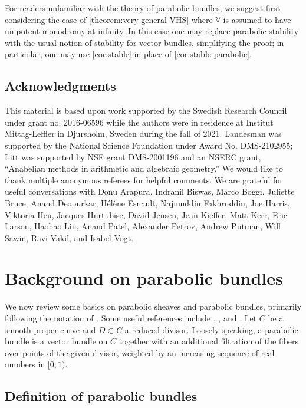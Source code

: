 \documentclass[12 pt]{amsart}
\theoremstyle{plain}
\theoremstyle{definition}
\theoremstyle{remark}
\numberwithin{equation}{section}
\begin{document}
For readers unfamiliar with the theory of parabolic bundles, we suggest first considering the case of \autoref{theorem:very-general-VHS} where $\mathbb{V}$ is assumed to have unipotent monodromy at infinity. In this case one may replace parabolic stability with the usual notion of stability for vector bundles,  simplifying the proof;  in particular, one may use \autoref{cor:stable} in place of \autoref{cor:stable-parabolic}.
\subsection{Acknowledgments}
This material is based upon work supported by the Swedish Research Council under
grant no. 2016-06596 while the authors were in residence at Institut
Mittag-Leffler in Djursholm, Sweden during the fall of 2021. 
Landesman was supported by the National Science
Foundation under Award No. DMS-2102955;
Litt was supported by NSF grant DMS-2001196 and an NSERC grant, “Anabelian methods in arithmetic and algebraic geometry.” 
We would like to thank multiple anonymous referees for helpful comments.
We are grateful for useful conversations with 
Donu Arapura,
Indranil Biswas, 
Marco Boggi, 
Juliette Bruce, 
Anand Deopurkar,
H\'el\`ene Esnault, 
Najmuddin Fakhruddin,
Joe Harris,
Viktoria Heu,
Jacques Hurtubise, 
David Jensen, 
Jean Kieffer,
Matt Kerr,
Eric Larson, 
Haohao Liu,
Anand Patel,
Alexander Petrov,
Andrew Putman,
Will Sawin,
Ravi Vakil,
and Isabel Vogt.


\section{Background on parabolic bundles}
\label{section:parabolic}

We now review some basics on parabolic sheaves and parabolic bundles, primarily following the notation of
\cite[\S2.3]{BHH:parabolic}.
Some useful references include 
\cite[Part 3, \S1]{seshadri:fibres-vectoriels-sur-les-courbes-algebriques},
\cite[\S1 and \S3]{yokogawa:infinitesimal-deformation}, and
\cite[\S2]{bodenY:moduli-spaces-of-parabolic-higgs-bundles}.
Let $C$ be a smooth proper curve and $D\subset C$ a reduced divisor. Loosely speaking, a parabolic bundle is a vector bundle on $C$ together with an additional
filtration of the fibers over points of the given divisor, weighted by an increasing sequence of real numbers in $[0,1)$.

\subsection{Definition of parabolic bundles}
\label{subsubsection:definition-parabolic}
\end{document}
